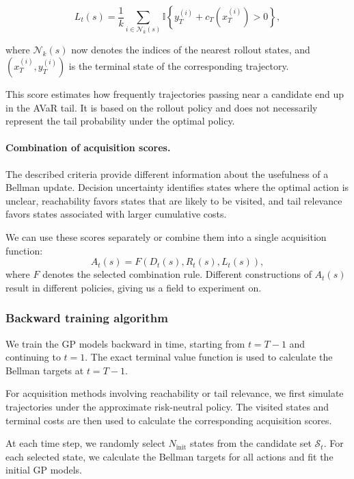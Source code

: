 \begin{equation}
	L_t(s)
	=
	\frac{1}{k}
	\sum_{i\in\mathcal N_k(s)}
	\mathbb{I}
	\left\{
	y_T^{(i)}+c_T(x_T^{(i)})>0
	\right\},
	\label{tail-score}
\end{equation}

where $\mathcal N_k(s)$ now denotes the indices of the nearest rollout states, and $(x_T^{(i)},y_T^{(i)})$ is the terminal state of the corresponding trajectory.

This score estimates how frequently trajectories passing near a candidate end up in the AVaR tail. It is based on the rollout policy and does not necessarily represent the tail probability under the optimal policy.

\paragraph{Combination of acquisition scores.}

The described criteria provide different information about the usefulness of a Bellman update. Decision uncertainty identifies states where the optimal action is unclear, reachability favors states that are likely to be visited, and tail relevance favors states associated with larger cumulative costs.

We can use these scores separately or combine them into a single acquisition function:
\begin{equation}
	A_t(s)
	=
	F\left(D_t(s),R_t(s),L_t(s)\right),
	\label{acquisition-score-general}
\end{equation}
where $F$ denotes the selected combination rule. Different constructions of $A_t(s)$ result in different policies, giving us a field to experiment on.

\subsubsection{Backward training algorithm}
\label{method:training}

We train the GP models backward in time, starting from $t=T-1$ and continuing to $t=1$. The exact terminal value function is used to calculate the Bellman targets at $t=T-1$.

For acquisition methods involving reachability or tail relevance, we first simulate trajectories under the approximate risk-neutral policy. The visited states and terminal costs are then used to calculate the corresponding acquisition scores.

At each time step, we randomly select $N_{\text{init}}$ states from the candidate set $\mathcal{S}_t$. For each selected state, we calculate the Bellman targets for all actions and fit the initial GP models.

